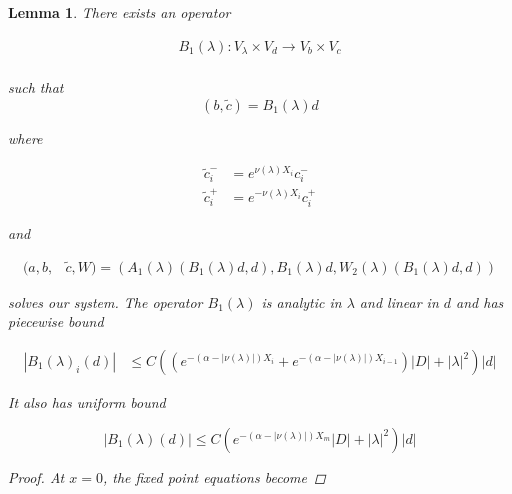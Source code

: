 \documentclass[12pt]{article}
\newtheorem{lemma}{Lemma}
\begin{document}
\begin{lemma}\label{inv3}
There exists an operator

\begin{align*}
B_1(\lambda): V_\lambda \times V_d \rightarrow V_b \times V_c \\
\end{align*}

such that 
\[
(b, \tilde{c}) = B_1(\lambda)d
\]

where

\begin{align*}
\tilde{c}_i^- &= e^{\nu(\lambda)X_i} c_i^- \\
\tilde{c}_i^+ &= e^{-\nu(\lambda)X_i} c_i^+
\end{align*}

and

\begin{align*}
(a,b,&\tilde{c}, W) 
= (A_1(\lambda)(B_1(\lambda)d, d), B_1(\lambda)d, W_2(\lambda)(B_1(\lambda)d, d))
\end{align*}

solves our system. The operator $B_1(\lambda)$ is analytic in $\lambda$ and linear in $d$ and has piecewise bound

\begin{align*}
|B_1(\lambda)_i(d)| &\leq C ( (e^{-(\alpha - |\nu(\lambda)|) X_i} + e^{-(\alpha - |\nu(\lambda)|) X_{i-1}} ) |D| + |\lambda|^2 )|d|
\end{align*}

It also has uniform bound

\begin{equation}
|B_1(\lambda)(d)| \leq C ( e^{-(\alpha - |\nu(\lambda)|) X_m} |D| + |\lambda|^2 )|d|
\end{equation}

\begin{proof}

At $x = 0$, the fixed point equations become


\end{proof}
\end{lemma}
\end{document}

